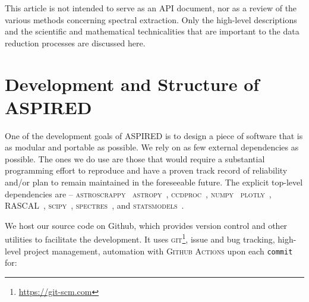 \documentclass[linenumbers, twocolumn]{aastex631}
\begin{document}
This article is not intended to serve as an API document, nor as a review of the
various methods concerning spectral extraction. Only the high-level
descriptions and the scientific and mathematical technicalities that are
important to the data reduction processes are discussed here.

\section{Development and Structure of \textsc{ASPIRED}}
\label{sec:development}

One of the development goals of \textsc{ASPIRED} is to design a piece of software that is as
modular and portable as possible. We rely on as few external dependencies as possible.
The ones we do use are those that would require a substantial programming effort to reproduce and have a
proven track record of reliability and/or plan to remain maintained in the
foreseeable future. The explicit top-level dependencies are --
\textsc{astroscrappy}~\citep{curtis_mccully_2018_1482019, 2001PASP..113.1420V}
\textsc{astropy}~\citep{astropy:2013, astropy:2018},
\textsc{ccdproc}~\citep{matt_craig_2017_1069648},
\textsc{numpy}~\citep{2020NumPy-Array}
\textsc{plotly}~\citep{plotly},
\textsc{RASCAL}~\citep{2020ASPC..527..627V},
\textsc{scipy}~\citep{2020SciPy-NMeth},
\textsc{spectres}~\citep{2017arXiv170505165C}, and
\textsc{statsmodels}~\citep{seabold2010statsmodels}. 

We host our source code on Github, which provides version control and other
utilities to facilitate the development. It uses \textsc{git}\footnote{\url{https://git-scm.com}},
issue and bug tracking, high-level project management, automation with \textsc{Github Actions}
upon each \texttt{commit} for:
\end{document}
